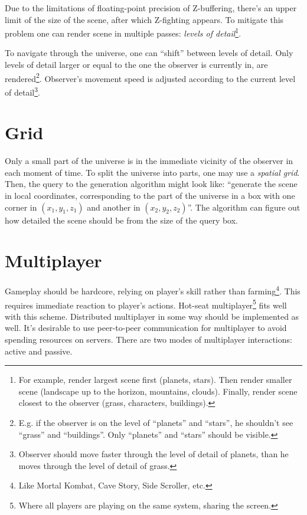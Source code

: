\documentclass[12pt]{article}
\begin{document}
Due to the limitations of floating-point precision of Z-buffering, there's an
upper limit of the size of the scene, after which Z-fighting appears.
To mitigate this problem one can render scene in multiple passes:
\emph{levels of detail}\footnote{
    For example, render largest scene first (planets, stars).
    Then render smaller scene (landscape up to the horizon, mountains, clouds).
    Finally, render scene closest to the observer
    (grass, characters, buildings).
}.

To navigate through the universe, one can ``shift'' between levels of detail.
Only levels of detail larger or equal to the one the observer is currently in,
are rendered\footnote{
    E.g. if the observer is on the level of ``planets'' and ``stars'',
    he shouldn't see ``grass'' and ``buildings''.
    Only ``planets'' and ``stars'' should be visible.}.
Observer's movement speed is adjusted according to the current level of
detail\footnote{
    Observer should move faster through the level of detail of planets,
    than he moves through the level of detail of grass.
}.

\section{Grid}

Only a small part of the universe is in the immediate vicinity of the observer
in each moment of time.
To split the universe into parts, one may use a \emph{spatial grid}.
Then, the query to the generation algorithm might look like:
``generate the scene in local coordinates, corresponding to the part of the
universe in a box with one corner in \((x_1, y_1, z_1)\) and another in
\((x_2, y_2, z_2)\)''.
The algorithm can figure out how detailed the scene should be from the size of
the query box.

\section{Multiplayer}

Gameplay should be hardcore, relying on player's skill rather than
farming\footnote{
    Like Mortal Kombat, Cave Story, Side Scroller, etc.}.
This requires immediate reaction to player's actions.
Hot-seat multiplayer\footnote{
    Where all players are playing on the same system, sharing
    the screen.
} fits well with this scheme.
Distributed multiplayer in some way should be implemented as well.
It's desirable to use peer-to-peer communication for multiplayer
to avoid spending resources on servers.
There are two modes of multiplayer interactions: active and passive.
\end{document}
